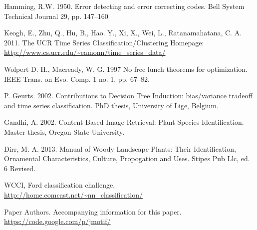\documentclass{llncs}
\begin{document}
\begin{thebibliography}{5}
Hamming, R.W. 1950.
Error detecting and error correcting codes. 
Bell System Technical Journal 29, pp. 147--160

Keogh, E., Zhu, Q., Hu, B., Hao. Y.,  Xi, X., Wei, L., Ratanamahatana, C. A. 2011.
The UCR Time Series Classification/Clustering Homepage:
\url{http://www.cs.ucr.edu/~eamonn/time_series_data/}

Wolpert D. H., Macready, W. G. 1997
No free lunch theorems for optimization.
IEEE Trans. on Evo. Comp. 1 no. 1, pp. 67--82.

P. Geurts. 2002.
Contributions to Decision Tree Induction: bias/variance tradeoﬀ and time series classiﬁcation.
PhD thesis, University of Lige, Belgium.

Gandhi, A. 2002.
Content-Based Image Retrieval: Plant Species Identification. 
Master thesis, Oregon State University.

Dirr, M. A. 2013.
Manual of Woody Landscape Plants: Their Identification, Ornamental Characteristics,
Culture, Propogation and Uses.
Stipes Pub Llc, ed. 6 Revised.

WCCI, Ford classification challenge, \url{http://home.comcast.net/~nn_classification/}

Paper Authors. 
Accompanying information for this paper. 
\url{https://code.google.com/p/jmotif/}

\end{thebibliography}

%
\end{document}

